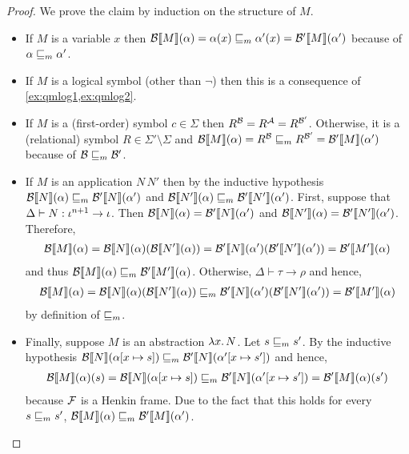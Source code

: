 \documentclass[a4paper,twoside,notitlepage,openright,11pt]{report}
\begin{document}
\begin{proof}
  We prove the claim by induction on the structure of $M$.
  \begin{itemize}[noitemsep]
  \item If $M$ is a variable $x$ then ${\mathcal B}\llbracket M\rrbracket(\alpha)=\alpha(x)\sqsubseteq_m\alpha'(x)={\mathcal B'}\llbracket M\rrbracket(\alpha')$ because of $\alpha\sqsubseteq_m\alpha'$.
  \item If $M$ is a logical symbol (other than $\neg$) then this is a consequence of \cref{ex:qmlog1,ex:qmlog2}. 
  \item If $M$ is a (first-order) symbol $c\in\Sigma$ then $R^\mathcal B=R^\mathcal A=R^{\mathcal B'}$. Otherwise, it is a (relational) symbol $R\in\Sigma'\setminus\Sigma$ and ${\mathcal B}\llbracket M\rrbracket(\alpha)=R^\mathcal B\sqsubseteq_m R^{\mathcal B'}={\mathcal B'}\llbracket M\rrbracket(\alpha')$ because of $\mathcal B\sqsubseteq_m\mathcal B'$.
  \item If $M$ is an application $N\,N'$ then by the inductive hypothesis ${\mathcal B}\llbracket N\rrbracket(\alpha)\sqsubseteq_m{\mathcal B'}\llbracket N\rrbracket(\alpha')$ and ${\mathcal B}\llbracket N'\rrbracket(\alpha)\sqsubseteq_m{\mathcal B'}\llbracket N'\rrbracket(\alpha')$. First, suppose that $\Delta\vdash N:\iota^{n+1}\to\iota$. Then ${\mathcal B}\llbracket N\rrbracket(\alpha)={\mathcal B'}\llbracket N\rrbracket(\alpha')$ and ${\mathcal B}\llbracket N'\rrbracket(\alpha)={\mathcal B'}\llbracket N'\rrbracket(\alpha')$. Therefore,
    \begin{align*}
      {\mathcal B}\llbracket M\rrbracket(\alpha)={\mathcal B}\llbracket N\rrbracket(\alpha)({\mathcal B}\llbracket N'\rrbracket(\alpha))= {\mathcal B'}\llbracket N\rrbracket(\alpha')({\mathcal B'}\llbracket N'\rrbracket(\alpha'))={\mathcal B'}\llbracket M'\rrbracket(\alpha)
    \end{align*}
    and thus ${\mathcal B}\llbracket M\rrbracket(\alpha)\sqsubseteq_m{\mathcal B'}\llbracket M'\rrbracket(\alpha)$.
    Otherwise, $\Delta\vdash\tau\to\rho$ and hence,
    \begin{align*}
      {\mathcal B}\llbracket M\rrbracket(\alpha)={\mathcal B}\llbracket N\rrbracket(\alpha)({\mathcal B}\llbracket N'\rrbracket(\alpha))\sqsubseteq_m {\mathcal B'}\llbracket N\rrbracket(\alpha')({\mathcal B'}\llbracket N'\rrbracket(\alpha'))={\mathcal B'}\llbracket M'\rrbracket(\alpha)
    \end{align*}
    by definition of $\sqsubseteq_m$.
  \item Finally, suppose $M$ is an abstraction $\lambda x\ldotp N$. Let $s\sqsubseteq_m s'$. 
    By the inductive hypothesis ${\mathcal B}\llbracket N\rrbracket(\alpha[x\mapsto s])\sqsubseteq_m{\mathcal B'}\llbracket N\rrbracket(\alpha'[x\mapsto s'])$ and hence,
    \begin{align*}
      {\mathcal B}\llbracket M\rrbracket(\alpha)(s)={\mathcal B}\llbracket N\rrbracket(\alpha[x\mapsto s])\sqsubseteq_m{\mathcal B'}\llbracket N\rrbracket(\alpha'[x\mapsto s'])={\mathcal B'}\llbracket M\rrbracket(\alpha)(s')
    \end{align*}
    because $\mathcal F$ is a Henkin frame.
    Due to the fact that this holds for every $s\sqsubseteq_m s'$, ${\mathcal B}\llbracket M\rrbracket(\alpha)\sqsubseteq_m {\mathcal B'}\llbracket M\rrbracket(\alpha')$.\qedhere
  \end{itemize}
\end{proof}
\end{document}
